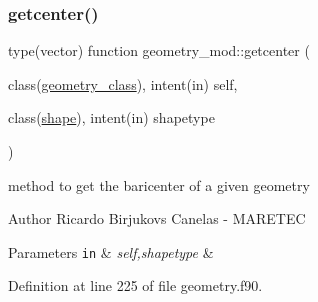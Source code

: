 \mbox{\label{namespacegeometry__mod_a4a38edbff02aa0ff5f16a16c39bf778e}} 
\subsubsection{\texorpdfstring{getcenter()}{getcenter()}}
{\footnotesize\ttfamily type(vector) function geometry\+\_\+mod\+::getcenter (\begin{DoxyParamCaption}\item[{class(\mbox{\hyperlink{structgeometry__mod_1_1geometry__class}{geometry\+\_\+class}}), intent(in)}]{self,  }\item[{class(\mbox{\hyperlink{structgeometry__mod_1_1shape}{shape}}), intent(in)}]{shapetype }\end{DoxyParamCaption})\hspace{0.3cm}{\ttfamily [private]}}



method to get the baricenter of a given geometry 

\begin{DoxyAuthor}{Author}
Ricardo Birjukovs Canelas -\/ M\+A\+R\+E\+T\+EC 
\end{DoxyAuthor}

\begin{DoxyParams}[1]{Parameters}
\mbox{\tt in}  & {\em self,shapetype} & \\
\hline
\end{DoxyParams}


Definition at line 225 of file geometry.\+f90.


